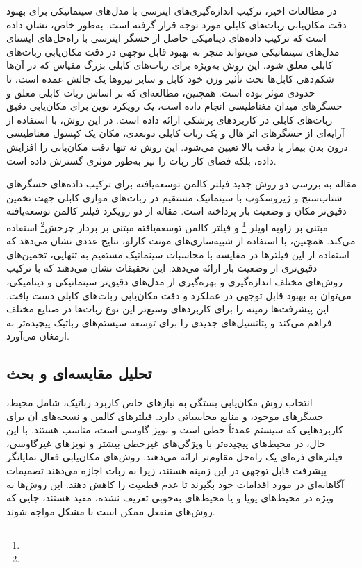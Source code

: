 در مطالعات اخیر، ترکیب اندازه‌گیری‌های اینرسی با مدل‌های سینماتیکی برای بهبود دقت مکان‌یابی ربات‌های کابلی مورد توجه قرار گرفته است. به‌طور خاص، 
\cite{murtra2013imu}
نشان داده است که ترکیب داده‌های دینامیکی حاصل از حسگر اینرسی با راه‌حل‌های ایستای مدل‌های سینماتیکی می‌تواند منجر به بهبود قابل توجهی در دقت مکان‌یابی ربات‌های کابلی معلق شود. این روش به‌ویژه برای ربات‌های کابلی بزرگ مقیاس که در آن‌ها شکم‌دهی کابل‌ها تحت تأثیر وزن خود کابل و سایر نیروها یک چالش عمده است، تا حدودی موثر بوده است. همچنین،
\cite{kim2020robotic}
مطالعه‌ای که بر اساس ربات کابلی معلق و حسگرهای میدان مغناطیسی انجام داده است، یک رویکرد نوین برای مکان‌یابی دقیق ربات‌های کابلی در کاربردهای پزشکی ارائه داده است. در این روش، با استفاده از آرایه‌ای از حسگرهای اثر هال و یک ربات کابلی دوبعدی، مکان یک کپسول مغناطیسی درون بدن بیمار با دقت بالا تعیین می‌شود. این روش نه تنها دقت مکان‌یابی را افزایش داده، بلکه فضای کار ربات را نیز به‌طور موثری گسترش داده است.

مقاله
\cite{le2021cable}
 به بررسی دو روش جدید فیلتر کالمن توسعه‌یافته برای ترکیب داده‌های حسگرهای شتاب‌سنج و ژیروسکوپ با سینماتیک مستقیم در ربات‌های موازی کابلی جهت تخمین دقیق‌تر مکان و وضعیت بار پرداخته است. مقاله از دو رویکرد فیلتر کالمن توسعه‌یافته مبتنی بر زاویه اویلر
 \footnote{}
  و فیلتر کالمن توسعه‌یافته مبتنی بر بردار چرخش\footnote{} استفاده می‌کند. همچنین، با استفاده از شبیه‌سازی‌های مونت کارلو، نتایج عددی نشان می‌دهد که استفاده از این فیلترها در مقایسه با محاسبات سینماتیک مستقیم به تنهایی، تخمین‌های دقیق‌تری از وضعیت بار ارائه می‌دهد. این تحقیقات نشان می‌دهند که با ترکیب روش‌های مختلف اندازه‌گیری و بهره‌گیری از مدل‌های دقیق‌تر سینماتیکی و دینامیکی، می‌توان به بهبود قابل توجهی در عملکرد و دقت مکان‌یابی ربات‌های کابلی دست یافت. این پیشرفت‌ها زمینه را برای کاربردهای وسیع‌تر این نوع ربات‌ها در صنایع مختلف فراهم می‌کند و پتانسیل‌های جدیدی را برای توسعه سیستم‌های رباتیک پیچیده‌تر به ارمغان می‌آورد.

\subsection{تحلیل مقایسه‌ای و بحث}

انتخاب روش مکان‌یابی بستگی به نیازهای خاص کاربرد رباتیک، شامل محیط، حسگرهای موجود، و منابع محاسباتی دارد. فیلترهای کالمن و نسخه‌های آن برای کاربردهایی که سیستم عمدتاً خطی است و نویز گاوسی است، مناسب هستند. با این حال، در محیط‌های پیچیده‌تر با ویژگی‌های غیرخطی بیشتر و نویزهای غیرگاوسی، فیلترهای ذره‌ای یک راه‌حل مقاوم‌تر ارائه می‌دهند. روش‌های مکان‌یابی فعال نمایانگر پیشرفت قابل توجهی در این زمینه هستند، زیرا به ربات اجازه می‌دهند تصمیمات آگاهانه‌ای در مورد اقدامات خود بگیرند تا عدم قطعیت را کاهش دهند. این روش‌ها به ویژه در محیط‌های پویا و یا محیط‌های به‌خوبی تعریف نشده، مفید هستند، جایی که روش‌های منفعل ممکن است با مشکل مواجه شوند.

